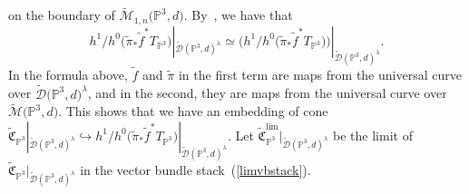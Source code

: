 \documentclass[pdftex]{sigma}
\numberwithin{equation}{section}
\newcommand{\PP}{\mathbb P}
\theoremstyle{plain}
\theoremstyle{definition}
\theoremstyle{remark}
\begin{document}
\begin{Remark}
on the boundary of $\widetilde{\mathcal{M}}_{1,n}\big(\PP^3,d\big)$. By~\cite{HL}, we have that
\[
h^1/h^0\big(\widetilde{\pi}_*\widetilde{f}^*T_{\PP^3}\big)|_{\widetilde{\mathcal{D}}(\PP^3,d)^{\lambda}}\simeq \big(h^1/h^0\big(\widetilde{\pi}_*\widetilde{f}^*T_{\PP^3}\big)\big)|_{\widetilde{\mathcal{D}} (\PP^3,d)^{\lambda}}.
\]
In the formula above, $\widetilde{f}$ and $\widetilde{\pi}$ in the first term are maps from the universal curve over $\widetilde{\mathcal{D}}\big(\PP^3,d\big)^{\lambda}$, and in the second, they are maps from the universal curve over $\widetilde{\mathcal{M}}\big(\PP^3,d\big)$. This shows that we have an embedding of cone $\widetilde{\mathfrak{C}}_{\PP^3}|_{\widetilde{\mathcal{D}}(\PP^3,d)^{\lambda}}\hookrightarrow h^1/h^0\big(\widetilde{\pi}_*\widetilde{f}^*T_{\PP^3}\big)|_{\widetilde{\mathcal{D}}(\PP^3,d)^{\lambda}}$. Let $\widetilde{\mathfrak{C}}_{\PP^3}^{\mathrm{lim}}|_{\widetilde{\mathcal{D}}(\PP^3,d)^{\lambda}}$ be the limit of $\widetilde{\mathfrak{C}}_{\PP^3}|_{\widetilde{\mathcal{D}}(\PP^3,d)^{\lambda}}$ in the vector bundle stack~(\ref{limvbstack}).


\end{Remark}
\end{document}
